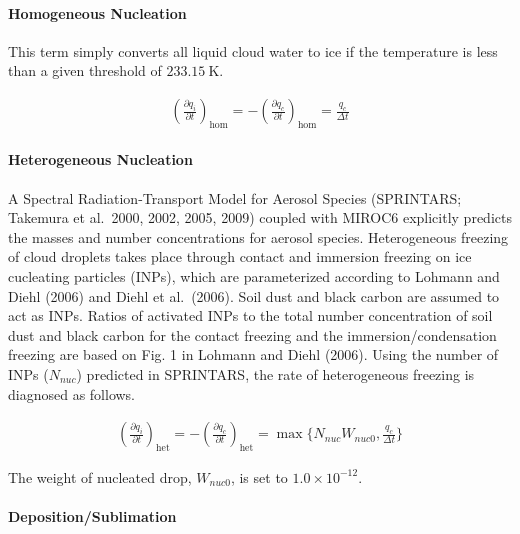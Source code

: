 \hypertarget{homogeneous-nucleation}{%
\paragraph{Homogeneous Nucleation}\label{homogeneous-nucleation}}

This term simply converts all liquid cloud water to ice if the temperature is less than a given threshold of \(233.15 \mathrm{~K}\).

\begin{eqnarray}
\left(\frac{\partial q_i}{\partial t}\right)_{\text {hom}}
=-\left(\frac{\partial q_c}{\partial t}\right)_{\text {hom}}
=  \frac{q_c}{\Delta t}
\end{eqnarray}

\hypertarget{heterogeneous-nucleation}{%
\paragraph{Heterogeneous Nucleation}\label{heterogeneous-nucleation}}

A Spectral Radiation-Transport Model for Aerosol Species (SPRINTARS; Takemura et al.~2000, 2002, 2005, 2009) coupled with MIROC6 explicitly predicts the masses and number concentrations for aerosol
species. Heterogeneous freezing of cloud droplets takes place through contact and immersion freezing on ice cucleating particles (INPs), which are parameterized according to Lohmann and Diehl (2006)
and Diehl et al.~(2006). Soil dust and black carbon are assumed to act as INPs. Ratios of activated INPs to the total number concentration of soil dust and black carbon for the contact freezing and
the immersion/condensation freezing are based on Fig. 1 in Lohmann and Diehl (2006). Using the number of INPs (\(N_{nuc}\)) predicted in SPRINTARS, the rate of heterogeneous freezing is diagnosed as
follows.

\begin{eqnarray}
\left(\frac{\partial q_i}{\partial t}\right)_{\text {het}}
=-\left(\frac{\partial q_c}{\partial t}\right)_{\text {het}}
=  \max \{N_{nuc} W_{nuc0}, \frac{q_c}{\Delta t}\}
\end{eqnarray}

The weight of nucleated drop, \(W_{nuc0}\), is set to \(1.0\times10^{-12}\).

\hypertarget{depositionsublimation}{%
\paragraph{Deposition/Sublimation}\label{depositionsublimation}}

